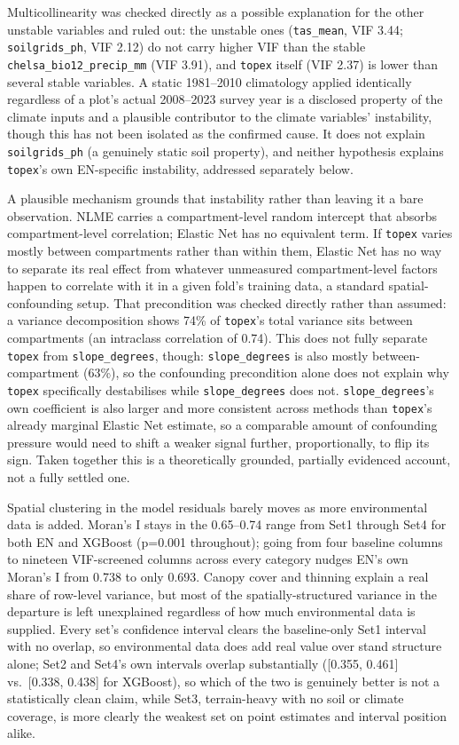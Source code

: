 \documentclass[11pt,a4paper]{report}
\begin{document}
Multicollinearity was checked directly as a possible explanation for the other
unstable variables and ruled out: the unstable ones (\texttt{tas\_mean}, VIF 3.44;
\texttt{soilgrids\_ph}, VIF 2.12) do not carry higher VIF than the stable
\texttt{chelsa\_bio12\_precip\_mm} (VIF 3.91), and \texttt{topex} itself (VIF 2.37) is
lower than several stable variables. A static 1981--2010 climatology applied
identically regardless of a plot's actual 2008--2023 survey year is a disclosed
property of the climate inputs and a plausible contributor to the climate variables'
instability, though this has not been isolated as the confirmed cause. It does not
explain \texttt{soilgrids\_ph} (a genuinely static soil property), and neither
hypothesis explains \texttt{topex}'s own EN-specific instability, addressed
separately below.

A plausible mechanism grounds that instability rather than leaving it a bare
observation. NLME carries a compartment-level random intercept that absorbs
compartment-level correlation; Elastic Net has no equivalent term. If \texttt{topex}
varies mostly between compartments rather than within them, Elastic Net has no way to
separate its real effect from whatever unmeasured compartment-level factors happen to
correlate with it in a given fold's training data, a standard spatial-confounding
setup. That precondition was checked directly rather than assumed: a variance
decomposition shows 74\% of \texttt{topex}'s total variance sits between compartments
(an intraclass correlation of 0.74). This does not fully separate \texttt{topex} from
\texttt{slope\_degrees}, though: \texttt{slope\_degrees} is also mostly
between-compartment (63\%), so the confounding precondition alone does not explain why
\texttt{topex} specifically destabilises while \texttt{slope\_degrees} does not.
\texttt{slope\_degrees}'s own coefficient is also larger and more consistent across
methods than \texttt{topex}'s already marginal Elastic Net estimate, so a comparable
amount of confounding pressure would need to shift a weaker signal further,
proportionally, to flip its sign. Taken together this is a theoretically grounded,
partially evidenced account, not a fully settled one.

Spatial clustering in the model residuals barely moves as more environmental data is
added. Moran's I stays in the 0.65--0.74 range from Set1 through Set4 for both EN and
XGBoost (p=0.001 throughout); going from four baseline columns to nineteen
VIF-screened columns across every category nudges EN's own Moran's I from 0.738 to
only 0.693. Canopy cover and thinning explain a real share of row-level variance, but
most of the spatially-structured variance in the departure is left unexplained
regardless of how much environmental data is supplied. Every set's confidence
interval clears the baseline-only Set1 interval with no overlap, so environmental data
does add real value over stand structure alone; Set2 and Set4's own intervals overlap
substantially ([0.355, 0.461] vs.\ [0.338, 0.438] for XGBoost), so which of the two is
genuinely better is not a statistically clean claim, while Set3, terrain-heavy with no
soil or climate coverage, is more clearly the weakest set on point estimates and
interval position alike.
\end{document}
